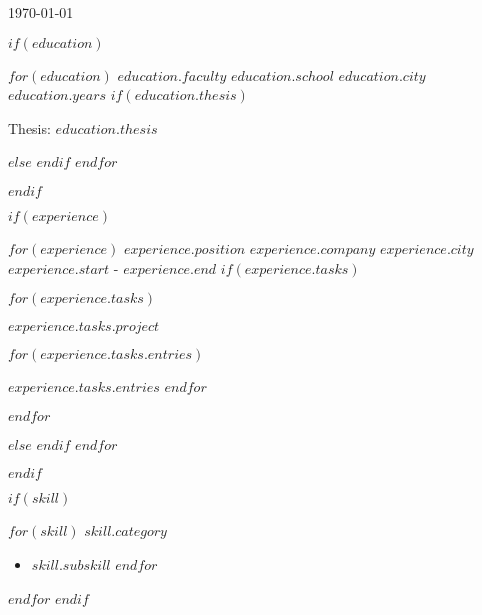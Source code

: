 \documentclass[$settings.fontSize$, $settings.format$]{awesome-cv}
\begin{document}
\makecvheader
{}
{\today}
{\thepage}

$if(education)$
\begin{cventries}
    $for(education)$
    \cventry
    {$education.faculty$}
    {$education.school$}
    {$education.city$}
    {$education.years$}
    $if(education.thesis)$
    {
        \begin{cvitems}
            \item{Thesis: $education.thesis$}
        \end{cvitems}
    }
    $else$
    {}
    $endif$
    $endfor$
\end{cventries}
$endif$

$if(experience)$
\begin{cventries}
    $for(experience)$
    \cventry
    {$experience.position$}
    {$experience.company$}
    {$experience.city$}
    {$experience.start$ - $experience.end$}
    $if(experience.tasks)$
    {
        \begin{cvitems}
            $for(experience.tasks)$
            \item[]{
                \textbf{$experience.tasks.project$}
                \begin{description}
                    $for(experience.tasks.entries)$
                    \item $experience.tasks.entries$
                    $endfor$
                \end{description}
            }
            $endfor$
        \end{cvitems}
    }
    $else$
    {}
    $endif$
    $endfor$
\end{cventries}
$endif$

$if(skill)$
\begin{cvskills}
$for(skill)$
    \cvskill
    {$skill.category$}
    {
        \begin{itemize}[label={}]
            $for(skill.subskill)$
            \item $skill.subskill$
            $endfor$
        \end{itemize}
    }
\end{cvskills}
$endfor$
$endif$
\end{document}
